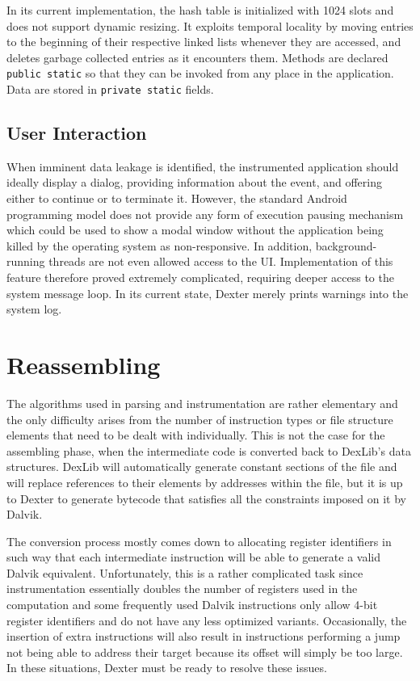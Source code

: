 \documentclass[12pt,twoside,notitlepage]{report}
\begin{document}
In its current implementation, the hash table is initialized with 1024 slots and does not support dynamic resizing. It exploits temporal locality by moving entries to the beginning of their respective linked lists whenever they are accessed, and deletes garbage collected entries as it encounters them. Methods are declared \verb$public static$ so that they can be invoked from any place in the application. Data are stored in \verb$private static$ fields.

\subsection{User Interaction}

When imminent data leakage is identified, the instrumented application should ideally display a dialog, providing information about the event, and offering either to continue or to terminate it. However, the standard Android programming model does not provide any form of execution pausing mechanism which could be used to show a modal window without the application being killed by the operating system as non-responsive. In addition, background-running threads are not even allowed access to the UI. Implementation of this feature therefore proved extremely complicated, requiring deeper access to the system message loop. In its current state, Dexter merely prints warnings into the system log.

\section{Reassembling}

The algorithms used in parsing and instrumentation are rather elementary and the only difficulty arises from the number of instruction types or file structure elements that need to be dealt with individually. This is not the case for the assembling phase, when the intermediate code is converted back to DexLib's data structures. DexLib will automatically generate constant sections of the file and will replace references to their elements by addresses within the file, but it is up to Dexter to generate bytecode that satisfies all the constraints imposed on it by Dalvik. 

The conversion process mostly comes down to allocating register identifiers in such way that each intermediate instruction will be able to generate a valid Dalvik equivalent. Unfortunately, this is a rather complicated task since instrumentation essentially doubles the number of registers used in the computation and some frequently used Dalvik instructions only allow 4-bit register identifiers and do not have any less optimized variants. Occasionally, the insertion of extra instructions will also result in instructions performing a jump not being able to address their target because its offset will simply be too large. In these situations, Dexter must be ready to resolve these issues.
\end{document}
